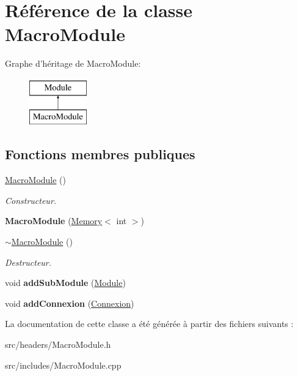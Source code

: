 \hypertarget{classMacroModule}{\section{Référence de la classe Macro\-Module}
\label{classMacroModule}
}
Graphe d'héritage de Macro\-Module\-:\begin{figure}[H]
\begin{center}
\leavevmode
\includegraphics[height=2.000000cm]{classMacroModule}
\end{center}
\end{figure}
\subsection*{Fonctions membres publiques}
\begin{DoxyCompactItemize}
\item 
\hypertarget{classMacroModule_a9127bbdf48fc8088284daca146ec3143}{\hyperlink{classMacroModule_a9127bbdf48fc8088284daca146ec3143}{Macro\-Module} ()}\label{classMacroModule_a9127bbdf48fc8088284daca146ec3143}

\begin{DoxyCompactList}\small\item\em Constructeur. \end{DoxyCompactList}\item 
\hypertarget{classMacroModule_ae89dde4614b49decad95bbdebdefb0a2}{{\bfseries Macro\-Module} (\hyperlink{classMemory}{Memory}$<$ int $>$)}\label{classMacroModule_ae89dde4614b49decad95bbdebdefb0a2}

\item 
\hypertarget{classMacroModule_a9790fb7c331d99dd03f624b1a5258519}{\hyperlink{classMacroModule_a9790fb7c331d99dd03f624b1a5258519}{$\sim$\-Macro\-Module} ()}\label{classMacroModule_a9790fb7c331d99dd03f624b1a5258519}

\begin{DoxyCompactList}\small\item\em Destructeur. \end{DoxyCompactList}\item 
\hypertarget{classMacroModule_ab06c8308028b56ed94b599ed814a1864}{void {\bfseries add\-Sub\-Module} (\hyperlink{classModule}{Module})}\label{classMacroModule_ab06c8308028b56ed94b599ed814a1864}

\item 
\hypertarget{classMacroModule_ad5aca9e5f7b8784959dae226f845cd20}{void {\bfseries add\-Connexion} (\hyperlink{classConnexion}{Connexion})}\label{classMacroModule_ad5aca9e5f7b8784959dae226f845cd20}

\end{DoxyCompactItemize}


La documentation de cette classe a été générée à partir des fichiers suivants \-:\begin{DoxyCompactItemize}
\item 
src/headers/Macro\-Module.\-h\item 
src/includes/Macro\-Module.\-cpp\end{DoxyCompactItemize}
